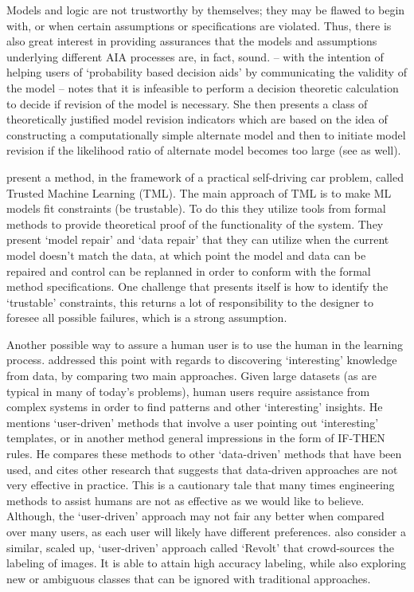     Models and logic are not trustworthy by themselves; they may be flawed to begin with, or when certain assumptions or specifications are violated. Thus, there is also great interest in providing assurances that the models and assumptions underlying different AIA processes are, in fact, sound. \citet{Laskey1991-mf} -- with the intention of helping users of `probability based decision aids' by communicating the validity of the model -- notes that it is infeasible to perform a decision theoretic calculation to decide if revision of the model is necessary. She then presents a class of theoretically justified model revision indicators which are based on the idea of constructing a computationally simple alternate model and then to initiate model revision if the likelihood ratio of alternate model becomes too large (see \citet{Zagorecki2015-qy,Habbema1976-xd} as well).

    \citet{Ghosh2016-dl} present a method, in the framework of a practical self-driving car problem, called Trusted Machine Learning (TML). The main approach of TML is to make ML models fit constraints (be trustable). To do this they utilize tools from formal methods to provide theoretical proof of the functionality of the system. They present `model repair' and `data repair' that they can utilize when the current model doesn't match the data, at which point the model and data can be repaired and control can be replanned in order to conform with the formal method specifications. One challenge that presents itself is how to identify the `trustable' constraints, this returns a lot of responsibility to the designer to foresee all possible failures, which is a strong assumption.

    Another possible way to assure a human user is to use the human in the learning process. \citet{Freitas2006-qo} addressed this point with regards to discovering `interesting' knowledge from data, by comparing two main approaches. Given large datasets (as are typical in many of today's problems), human users require assistance from complex systems in order to find patterns and other `interesting' insights. He mentions `user-driven' methods that involve a user pointing out `interesting' templates, or in another method general impressions in the form of IF-THEN rules. He compares these methods to other `data-driven' methods that have been used, and cites other research that suggests that data-driven approaches are not very effective in practice. This is a cautionary tale that many times engineering methods to assist humans are not as effective as we would like to believe. Although, the `user-driven' approach may not fair any better when compared over many users, as each user will likely have different preferences. \citet{Chang2017-kl} also consider a similar, scaled up, `user-driven' approach called `Revolt' that crowd-sources the labeling of images. It is able to attain high accuracy labeling, while also exploring new or ambiguous classes that can be ignored with traditional approaches.

